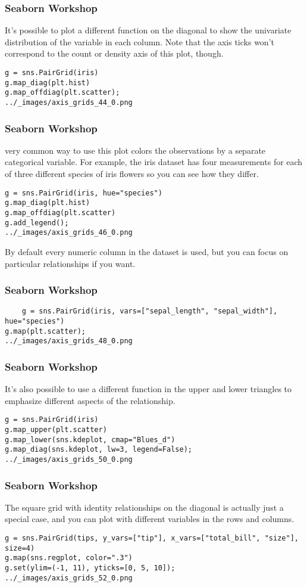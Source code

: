 \begin{frame}[fragile]
\frametitle{Seaborn Workshop}
\large
It’s possible to plot a different function on the diagonal to show the univariate distribution of the variable in each column. Note that the axis ticks won’t correspond to the count or density axis of this plot, though.
\begin{verbatim}
g = sns.PairGrid(iris)
g.map_diag(plt.hist)
g.map_offdiag(plt.scatter);
../_images/axis_grids_44_0.png
\end{verbatim}
\end{frame}
\begin{frame}[fragile]
\frametitle{Seaborn Workshop}
\largeA very common way to use this plot colors the observations by a separate categorical variable. For example, the iris dataset has four measurements for each of three different species of iris flowers so you can see how they differ.
\begin{verbatim}
g = sns.PairGrid(iris, hue="species")
g.map_diag(plt.hist)
g.map_offdiag(plt.scatter)
g.add_legend();
../_images/axis_grids_46_0.png
\end{verbatim}
By default every numeric column in the dataset is used, but you can focus on particular relationships if you want.
\end{frame}
\begin{frame}[fragile]
	\frametitle{Seaborn Workshop}
	\large
\begin{verbatim}
	g = sns.PairGrid(iris, vars=["sepal_length", "sepal_width"], hue="species")
g.map(plt.scatter);
../_images/axis_grids_48_0.png
\end{verbatim}
\end{frame}
\begin{frame}[fragile]
	\frametitle{Seaborn Workshop}
	\large
It’s also possible to use a different function in the upper and lower triangles to emphasize different aspects of the relationship.
\begin{verbatim}
g = sns.PairGrid(iris)
g.map_upper(plt.scatter)
g.map_lower(sns.kdeplot, cmap="Blues_d")
g.map_diag(sns.kdeplot, lw=3, legend=False);
../_images/axis_grids_50_0.png
\end{verbatim}

\end{frame}
\begin{frame}[fragile]
\frametitle{Seaborn Workshop}
\large

The square grid with identity relationships on the diagonal is actually just a special case, and you can plot with different variables in the rows and columns.
\begin{verbatim}
g = sns.PairGrid(tips, y_vars=["tip"], x_vars=["total_bill", "size"], size=4)
g.map(sns.regplot, color=".3")
g.set(ylim=(-1, 11), yticks=[0, 5, 10]);
../_images/axis_grids_52_0.png
\end{verbatim}
\end{frame}
